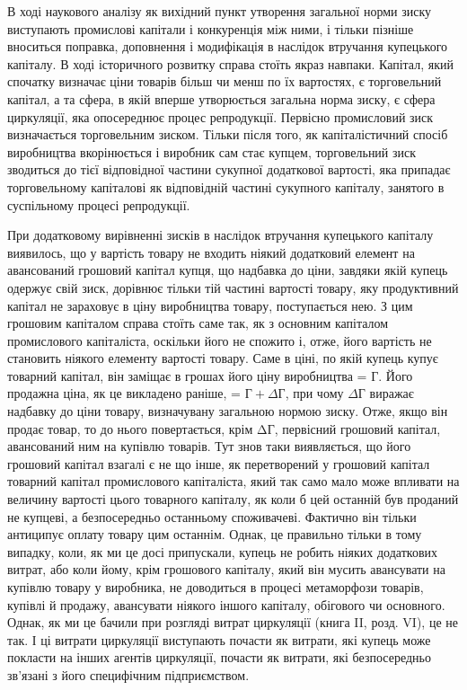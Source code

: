 \parcont{}  %
В ході наукового аналізу як вихідний пункт утворення загальної
норми зиску виступають промислові капітали і конкуренція
між ними, і тільки пізніше вноситься поправка, доповнення і модифікація
в наслідок втручання купецького капіталу. В ході історичного
розвитку справа стоїть якраз навпаки. Капітал, який спочатку
визначає ціни товарів більш чи менш по їх вартостях, є торговельний
капітал, а та сфера, в якій вперше утворюється загальна
норма зиску, є сфера циркуляції, яка опосереднює процес репродукції.
Первісно промисловий зиск визначається торговельним
зиском. Тільки після того, як капіталістичний спосіб виробництва
вкорінюється і виробник сам стає купцем, торговельний зиск
зводиться до тієї відповідної частини сукупної додаткової вартості,
яка припадає торговельному капіталові як відповідній
частині сукупного капіталу, занятого в суспільному процесі репродукції.

При додатковому вирівненні зисків в наслідок втручання
купецького капіталу виявилось, що у вартість товару не входить
ніякий додатковий елемент на авансований грошовий капітал
купця, що надбавка до ціни, завдяки якій купець одержує
свій зиск, дорівнює тільки тій частині вартості товару, яку
продуктивний капітал не зараховує в ціну виробництва товару,
поступається нею. З цим грошовим капіталом справа стоїть
саме так, як з основним капіталом промислового капіталіста,
оскільки його не спожито і, отже, його вартість не становить
ніякого елементу вартості товару. Саме в ціні, по якій купець
купує товарний капітал, він заміщає в грошах його ціну виробництва
= $Г$. Його продажна ціна, як це викладено раніше, = $Г + ΔГ$, при чому $ΔГ$ виражає надбавку до ціни
товару,
визначувану загальною нормою зиску. Отже, якщо він продає
товар, то до нього повертається, крім ΔГ, первісний грошовий
капітал, авансований ним на купівлю товарів. Тут знов таки
виявляється, що його грошовий капітал взагалі є не що інше,
як перетворений у грошовий капітал товарний капітал промислового
капіталіста, який так само мало може впливати на величину
вартості цього товарного капіталу, як коли б цей останній
був проданий не купцеві, а безпосередньо останньому споживачеві.
Фактично він тільки антиципує оплату товару цим
останнім. Однак, це правильно тільки в тому випадку, коли, як
ми це досі припускали, купець не робить ніяких додаткових
витрат, або коли йому, крім грошового капіталу, який він мусить
авансувати на купівлю товару у виробника, не доводиться
в процесі метаморфози товарів, купівлі й продажу, авансувати
ніякого іншого капіталу, обігового чи основного. Однак, як ми
це бачили при розгляді витрат циркуляції (книга II, розд. VI),
це не так. І ці витрати циркуляції виступають почасти як витрати,
які купець може покласти на інших агентів циркуляції,
почасти як витрати, які безпосередньо зв’язані з його специфічним
підприємством.
